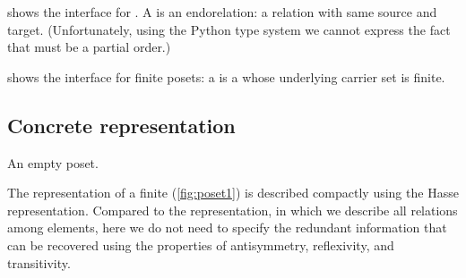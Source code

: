 

 shows the interface for .
A  is an endorelation: a relation with same source and target.
(Unfortunately, using the Python type system we cannot express the fact that  must be a partial order.)

 shows the interface for finite posets: a  is a  whose underlying carrier set is finite.




\begin{figure}[h!]
    \caption{}
    \label{fig:poset-finiteposet}
\end{figure}

\subsection{Concrete representation}
\begin{marginfigure}
    \caption{}
    \label{fig:poset1}
\end{marginfigure}
\begin{marginfigure}
    \caption{An empty poset.}
    \label{fig:poset_empty}
\end{marginfigure}

The representation of a finite  (\cref{fig:poset1}) is described compactly using the Hasse representation.
Compared to the  representation, in which we describe all relations among elements, here we do not need to specify the redundant information that can be recovered using the properties of antisymmetry, reflexivity, and transitivity.


